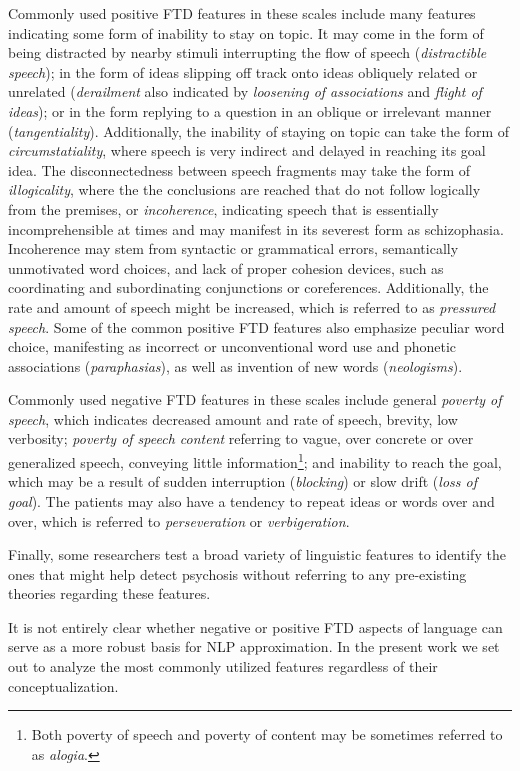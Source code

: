 Commonly used positive FTD features in these scales include many features indicating some form of inability to stay on topic. It may come in the form of being distracted by nearby stimuli interrupting the flow of speech (\textit{distractible speech}); in the form of ideas slipping off track onto ideas obliquely related or unrelated (\textit{derailment} also indicated by \textit{loosening of associations} and \textit{flight of ideas}); or in the form replying to a question in an oblique or irrelevant manner (\textit{tangentiality}). Additionally, the inability of staying on topic can take the form of \textit{circumstatiality}, where speech is very indirect and delayed in reaching its goal idea. The disconnectedness between speech fragments may take the form of \textit{illogicality}, where the the conclusions are reached that do not follow logically from the premises, or \textit{incoherence}, indicating speech that is essentially incomprehensible at times and may manifest in its severest form as schizophasia. Incoherence may stem from syntactic or grammatical errors, semantically unmotivated word choices, and lack of proper cohesion devices, such as coordinating and subordinating conjunctions or coreferences. Additionally, the rate and amount of speech might be increased, which is referred to as \textit{pressured speech}. Some of the common positive FTD features also emphasize peculiar word choice, manifesting as incorrect or unconventional word use and phonetic associations (\textit{paraphasias}), as well as invention of new words (\textit{neologisms}).

Commonly used negative FTD features in these scales include general \textit{poverty of speech}, which indicates decreased amount and rate of speech, brevity, low verbosity; \textit{poverty of speech content} referring to vague, over concrete or over generalized speech, conveying little information\footnote{Both poverty of speech and poverty of content may be sometimes referred to as \textit{alogia}.}; and inability to reach the goal, which may be a result of sudden interruption (\textit{blocking}) or slow drift  (\textit{loss of goal}). The patients may also have a tendency to repeat ideas or words over and over, which is referred to \textit{perseveration} or \textit{verbigeration}.

Finally, some researchers test a broad variety of linguistic features to identify the ones that might help detect psychosis without referring to any pre-existing theories regarding these features.

It is not entirely clear whether negative or positive FTD aspects of language can serve as a more robust basis for NLP approximation. In the present work we set out to analyze the most commonly utilized features regardless of their conceptualization.


